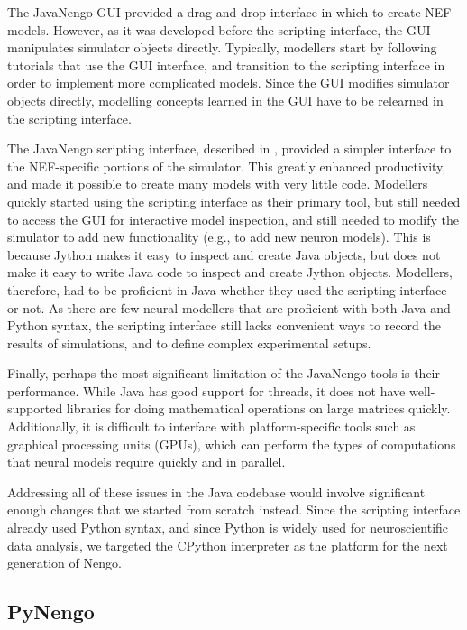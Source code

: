 \documentclass{frontiersSCNS}
\begin{document}
The JavaNengo GUI provided
a drag-and-drop interface in which to create NEF models.
However, as it was developed
before the scripting interface,
the GUI manipulates simulator objects directly.
Typically, modellers start by following
tutorials that use the GUI interface,
and transition to the scripting interface
in order to implement more complicated models.
Since the GUI modifies simulator objects directly,
modelling concepts learned in the GUI
have to be relearned in the scripting interface.

The JavaNengo scripting interface,
described in \cite{TODO},
provided a simpler interface
to the NEF-specific portions of the simulator.
This greatly enhanced productivity,
and made it possible
to create many models with very little code.
Modellers quickly started using
the scripting interface
as their primary tool,
but still needed to access the GUI
for interactive model inspection,
and still needed to modify the simulator
to add new functionality
(e.g., to add new neuron models).
This is because Jython makes it easy
to inspect and create Java objects,
but does not make it easy to
write Java code to
inspect and create Jython objects.
Modellers, therefore, had to be
proficient in Java whether
they used the scripting interface or not.
As there are few neural modellers
that are proficient with both Java and Python syntax,
the scripting interface still lacks
convenient ways to record the results of simulations,
and to define complex experimental setups.

Finally, perhaps the most significant limitation
of the JavaNengo tools is their performance.
While Java has good support for threads,
it does not have well-supported libraries
for doing mathematical operations on large matrices quickly.
Additionally, it is difficult to interface with
platform-specific tools such as
graphical processing units (GPUs),
which can perform the types of computations
that neural models require quickly and in parallel.

Addressing all of these issues
in the Java codebase would involve
significant enough changes
that we started from scratch instead.
Since the scripting interface
already used Python syntax,
and since Python is widely used
for neuroscientific data analysis,
we targeted the CPython interpreter
as the platform for the next generation of Nengo.

\subsection{PyNengo}
\end{document}
